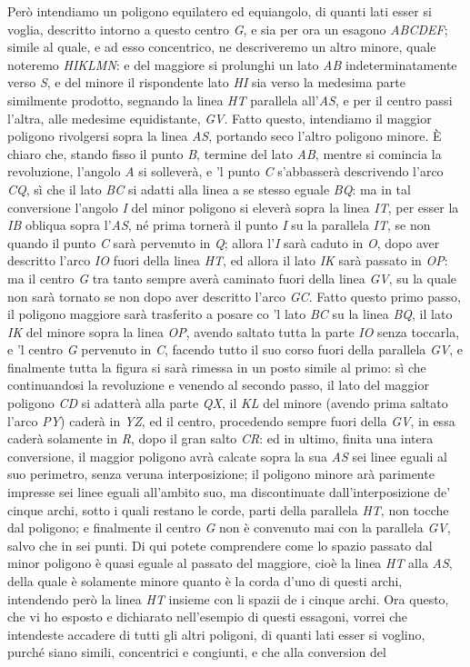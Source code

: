 \documentclass[11pt,twoside,openany]{book}
\begin{document}
Però intendiamo un poligono equilatero ed equiangolo, di quanti lati esser si voglia, descritto intorno a questo centro \emph{G}, e sia per ora un esagono \emph{ABCDEF}; simile al quale, e ad esso concentrico, ne descriveremo un altro minore, quale noteremo \emph{HIKLMN}: e del maggiore si prolunghi un lato \emph{AB} indeterminatamente verso \emph{S}, e del minore il rispondente lato \emph{HI} sia verso la medesima parte similmente prodotto, segnando la linea \emph{HT} parallela all'\emph{AS}, e per il centro passi l'altra, alle medesime equidistante, \emph{GV}. Fatto questo, intendiamo il maggior poligono rivolgersi sopra la linea \emph{AS}, portando seco l'altro poligono minore. È chiaro che, stando fisso il punto \emph{B}, termine del lato \emph{AB}, mentre si comincia la revoluzione, l'angolo \emph{A} si solleverà, e 'l punto \emph{C} s'abbasserà descrivendo l'arco \emph{CQ}, sì che il lato \emph{BC} si adatti alla linea a se stesso eguale \emph{BQ}: ma in tal conversione l'angolo \emph{I} del minor poligono si eleverà sopra la linea \emph{IT}, per esser la \emph{IB} obliqua sopra l'\emph{AS}, né prima tornerà il punto \emph{I} su la parallela \emph{IT}, se non quando il punto \emph{C} sarà pervenuto in \emph{Q}; allora l'\emph{I} sarà caduto in \emph{O}, dopo aver descritto l'arco \emph{IO} fuori della linea \emph{HT}, ed allora il lato \emph{IK} sarà passato in \emph{OP}: ma il centro \emph{G} tra tanto sempre averà caminato fuori della linea \emph{GV}, su la quale non sarà tornato se non dopo aver descritto l'arco \emph{GC}. Fatto questo primo passo, il poligono maggiore sarà trasferito a posare co 'l lato \emph{BC} su la linea \emph{BQ}, il lato \emph{IK} del minore sopra la linea \emph{OP}, avendo saltato tutta la parte \emph{IO} senza toccarla, e 'l centro \emph{G} pervenuto in \emph{C}, facendo tutto il suo corso fuori della parallela \emph{GV}, e finalmente tutta la figura si sarà rimessa in un posto simile al primo: sì che continuandosi la revoluzione e venendo al secondo passo, il lato del maggior poligono \emph{CD} si adatterà alla parte \emph{QX}, il \emph{KL} del minore (avendo prima saltato l'arco \emph{PY}) caderà in \emph{YZ}, ed il centro, procedendo sempre fuori della \emph{GV}, in essa caderà solamente in \emph{R}, dopo il gran salto \emph{CR}: ed in ultimo, finita una intera conversione, il maggior poligono avrà calcate sopra la sua \emph{AS} sei linee eguali al suo perimetro, senza veruna interposizione; il poligono minore arà parimente impresse sei linee eguali all'ambito suo, ma discontinuate dall'interposizione de' cinque archi, sotto i quali restano le corde, parti della parallela \emph{HT}, non tocche dal poligono; e finalmente il centro \emph{G} non è convenuto mai con la parallela \emph{GV}, salvo che in sei punti. Di qui potete comprendere come lo spazio passato dal minor poligono è quasi eguale al passato del maggiore, cioè la linea \emph{HT} alla \emph{AS}, della quale è solamente minore quanto è la corda d'uno di questi archi, intendendo però la linea \emph{HT} insieme con li spazii de i cinque archi. Ora questo, che vi ho esposto e dichiarato nell'esempio di questi essagoni, vorrei che intendeste accadere di tutti gli altri poligoni, di quanti lati esser si voglino, purché siano simili, concentrici e congiunti, e che alla conversion del 
\end{document}
